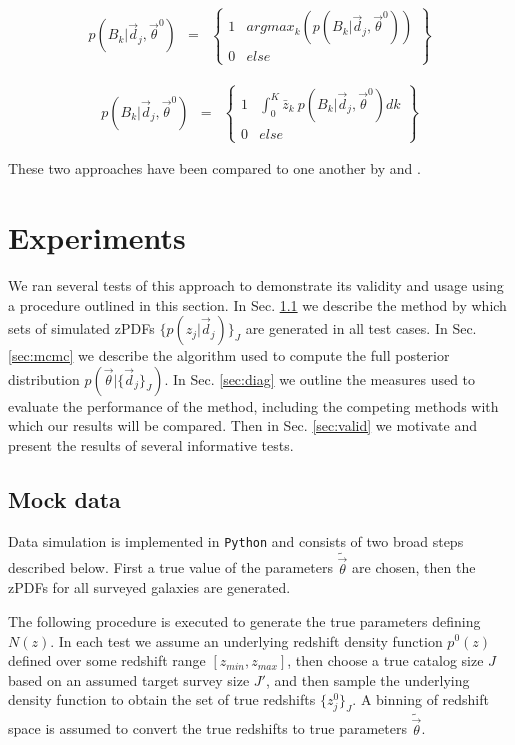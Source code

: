 \documentclass[preprint]{aastex}
\begin{document}
\begin{eqnarray}
\label{eq:map}
p(B_{k}|\vec{d}_{j},\vec{\theta}^{0}) &=& \left\{\begin{array}{cc}1&argmax_{k}(p(B_{k}|\vec{d}_{j},\vec{\theta}^{0}))\\0&else\end{array}\right\}
\end{eqnarray}

\begin{eqnarray}
\label{eq:expval}
p(B_{k}|\vec{d}_{j},\vec{\theta}^{0}) &=& \left\{\begin{array}{cc}1&\int_{0}^{K} \bar{z}_{k}\ p(B_{k}|\vec{d}_{j},\vec{\theta}^{0}) dk\\0&else\end{array}\right\}
\end{eqnarray}

These two approaches have been compared to one another by \citet{hil11} and \citet{ben12}.

\clearpage
\section{Experiments}
\label{sec:exp}

We ran several tests of this approach to demonstrate its validity and usage using a procedure outlined in this section.  In Sec. \ref{sec:mock} we describe the method by which sets of simulated zPDFs $\{p(z_{j}|\vec{d}_{j})\}_{J}$ are generated in all test cases.  In Sec. \ref{sec:mcmc} we describe the algorithm used to compute the full posterior distribution $p(\vec{\theta}|\{\vec{d}_{j}\}_{J})$.  In Sec. \ref{sec:diag} we outline the measures used to evaluate the performance of the method, including the competing methods with which our results will be compared.  Then in Sec. \ref{sec:valid} we motivate and present the results of several informative tests.

\clearpage
\subsection{Mock data}
\label{sec:mock}

Data simulation is implemented in \texttt{Python} and consists of two broad steps described below.  First a true value of the parameters $\tilde{\vec{\theta}}$ are chosen, then the zPDFs for all surveyed galaxies are generated.  

The following procedure is executed to generate the true parameters defining $N(z)$.  In each test we assume an underlying redshift density function $p^{0}(z)$ defined over some redshift range $[z_{min},z_{max}]$, then choose a true catalog size $J$ based on an assumed target survey size $J'$, and then sample the underlying density function to obtain the set of true redshifts $\{z_{j}^{0}\}_{J}$.  A binning of redshift space is assumed to convert the true redshifts to true parameters $\tilde{\vec{\theta}}$.
\end{document}
